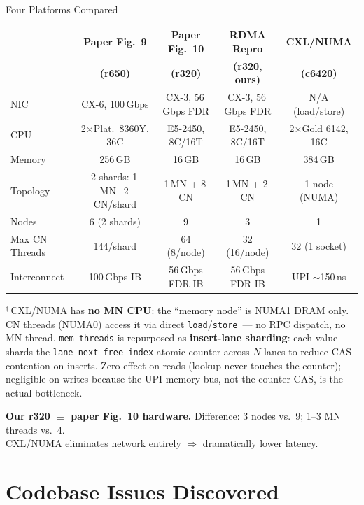 \documentclass[aspectratio=169]{beamer}
\begin{document}
\begin{frame}{Four Platforms Compared}
\centering
\scriptsize
\begin{tabular}{@{}lcccc@{}}
\toprule
 & \textbf{Paper Fig.~9} & \textbf{Paper Fig.~10} & \textbf{RDMA Repro} & \textbf{CXL/NUMA} \\
 & \textbf{(r650)} & \textbf{(r320)} & \textbf{(r320, ours)} & \textbf{(c6420)} \\
\midrule
NIC & CX-6, 100\,Gbps & CX-3, 56\,Gbps FDR & CX-3, 56\,Gbps FDR & N/A (load/store) \\
CPU & 2$\times$Plat.~8360Y, 36C & E5-2450, 8C/16T & E5-2450, 8C/16T & 2$\times$Gold 6142, 16C \\
Memory & 256\,GB & 16\,GB & 16\,GB & 384\,GB \\
Topology & 2 shards: 1\,MN+2\,CN/shard & 1\,MN + 8\,CN & 1\,MN + 2\,CN & 1 node (NUMA) \\
Nodes & 6 (2 shards) & 9 & 3 & 1 \\
Max CN Threads & 144/shard & 64 (8/node) & 32 (16/node) & 32 (1 socket) \\
Interconnect & 100\,Gbps IB & 56\,Gbps FDR IB & 56\,Gbps FDR IB & UPI $\sim$150\,ns \\
\bottomrule
\end{tabular}

\vspace{4pt}
\scriptsize
$^\dagger$\,CXL/NUMA has \textbf{no MN CPU}: the ``memory node'' is NUMA1 DRAM only.
CN threads (NUMA0) access it via direct \texttt{load}/\texttt{store}~--- no RPC dispatch, no MN thread.
\texttt{mem\_threads} is repurposed as \textbf{insert-lane sharding}: each value shards the
\texttt{lane\_next\_free\_index} atomic counter across $N$ lanes to reduce CAS contention on inserts.
Zero effect on reads (lookup never touches the counter); negligible on writes
because the UPI memory bus, not the counter CAS, is the actual bottleneck.

\vspace{2pt}
\small
\textbf{Our r320 $\equiv$ paper Fig.~10 hardware.} Difference: 3 nodes vs.\ 9; 1--3 MN threads vs.\ 4.\\
CXL/NUMA eliminates network entirely $\Rightarrow$ dramatically lower latency.
\end{frame}

\section{Codebase Issues Discovered}
\end{document}
